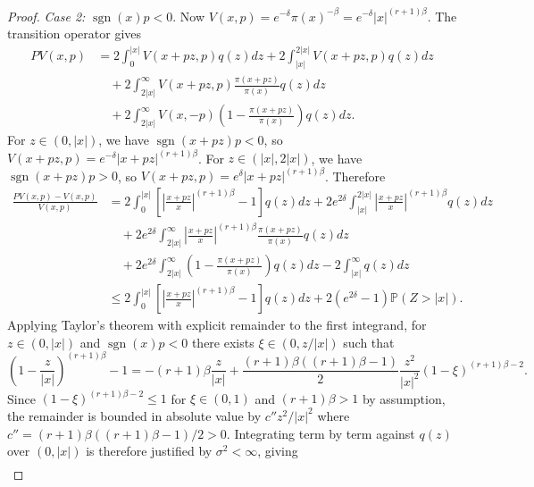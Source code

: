 \documentclass{article}
\theoremstyle{definition}
\theoremstyle{plain}
\begin{document}
\begin{proof}
\textit{Case 2:} $\operatorname{sgn}(x)p<0$.  Now $V(x,p) =e^{-\delta} \pi(x)^{-\beta} = e^{-\delta} |x|^{(r+1)\beta}$. The transition operator gives
\begin{equation}
\begin{aligned}
    PV(x,p) 
    &= 2\int_0^{|x|} V(x+pz,p) q(z) dz + 2\int_{|x|}^{2|x|} V(x+pz,p) q(z)dz\\
    &\quad + 2\int_{2|x|}^\infty V(x+pz,p)\frac{\pi(x+pz)}{\pi(x)}q(z)dz \\
    &\quad + 2\int_{2|x|}^\infty V(x,-p) \left(1-\frac{\pi(x+pz)}{\pi(x)}\right)q(z)dz.
\end{aligned}
\end{equation}
For $z\in(0,|x|)$, we have $\operatorname{sgn}(x+pz)p <0$, so $V(x+pz,p) = e^{-\delta} |x+pz|^{(r+1)\beta}$. For $z \in (|x|,2|x|)$, we have $\operatorname{sgn}(x+pz)p>0$, so $V(x+pz,p) = e^\delta |x+pz|^{(r+1)\beta}$. Therefore
\begin{equation}
\begin{aligned}
    \frac{PV(x,p) - V(x,p)}{V(x,p)}
    &= 2\int_0^{|x|} \left[\left|\frac{x+pz}{x}\right|^{(r+1)\beta}-1\right]q(z) dz + 2e^{2\delta} \int_{|x|}^{2|x|} \left|\frac{x+pz}{x}\right|^{(r+1)\beta}q(z)dz\\
    &\quad + 2e^{2\delta}\int_{2|x|}^\infty \left|\frac{x+pz}{x}\right|^{(r+1)\beta}\frac{\pi(x+pz)}{\pi(x)}q(z)dz\\
    &\quad + 2e^{2\delta}\int_{2|x|}^\infty \left(1- \frac{\pi(x+pz)}{\pi(x)}\right)q(z) dz -2\int_{|x|}^\infty q(z)dz\\
    &\le 2\int_0^{|x|}\left[\left|\frac{x+pz}{x}\right|^{(r+1)\beta}-1\right]q(z) dz + 2(e^{2\delta}-1) \mathbb{P}(Z > |x|).
\end{aligned}
\end{equation}
Applying Taylor's theorem with explicit remainder to the first integrand, for $z \in (0,|x|)$ and $\operatorname{sgn}(x)p < 0$ there exists $\xi \in (0, z/|x|)$ such that
\begin{equation*}
    \left(1-\frac{z}{|x|}\right)^{(r+1)\beta} - 1 = -(r+1)\beta\frac{z}{|x|} + \frac{(r+1)\beta((r+1)\beta-1)}{2}\frac{z^2}{|x|^2}(1-\xi)^{(r+1)\beta - 2}.
\end{equation*}
Since $(1-\xi)^{(r+1)\beta-2} \leq 1$ for $\xi \in (0,1)$ and $(r+1)\beta > 1$ by assumption, the remainder is bounded in absolute value by $c'' z^2/|x|^2$ where $c'' = (r+1)\beta((r+1)\beta-1)/2 > 0$. Integrating term by term against $q(z)$ over $(0,|x|)$ is therefore justified by $\sigma^2 < \infty$, giving
\begin{align}

\end{align}
\end{proof}
\end{document}
